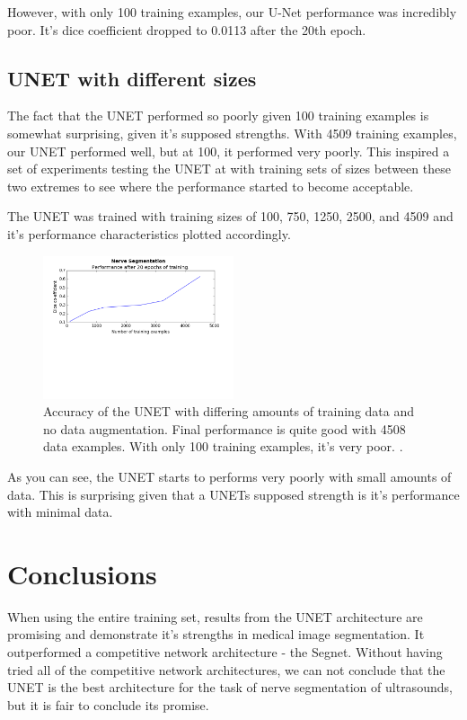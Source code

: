 \documentclass[letterpaper]{article}
\begin{document}
However, with only 100 training examples, our U-Net performance was incredibly poor. It's dice coefficient dropped to 0.0113 after the 20th epoch.

\subsection{UNET with different sizes}
The fact that the UNET performed so poorly given 100 training examples is somewhat surprising, given it's supposed strengths. With 4509 training examples, our UNET performed well, but at 100, it performed very poorly. This inspired a set of experiments testing the UNET at with training sets of sizes between these two extremes to see where the performance started to become acceptable. 

The UNET was trained with training sizes of 100, 750, 1250, 2500, and 4509 and it's performance characteristics plotted accordingly. 

 \begin{figure}[H]
  \centerline{\includegraphics[width=0.5\textwidth]{Plots/UNETPerformanceDifData.png}}
  \caption{Accuracy of  the UNET with differing amounts of training data and no data augmentation. Final performance is quite good with 4508 data examples. With only 100 training examples, it's very poor. .}
  \label{fig:trainingovertime2.}
\end{figure}

As you can see, the UNET starts to performs very poorly with small amounts of data. This is surprising given that a UNETs supposed strength is it's performance with minimal data.

\section{Conclusions}
When using the entire training set, results from the UNET architecture are promising and demonstrate it's strengths in medical image segmentation. It outperformed a competitive network architecture - the Segnet. Without having tried all of the competitive network architectures, we can not conclude that the UNET is the best architecture for the task of nerve segmentation of ultrasounds, but it is fair to conclude its promise. 
\end{document}

